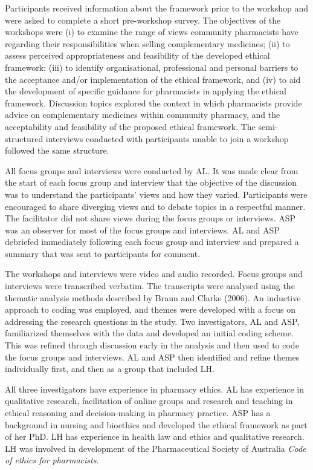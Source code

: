 \documentclass[12pt,]{article}
\begin{document}
Participants received information about the framework prior to the
workshop and were asked to complete a short pre-workshop survey. The
objectives of the workshops were (i) to examine the range of views
community pharmacists have regarding their responsibilities when selling
complementary medicines; (ii) to assess perceived appropriateness and
feasibility of the developed ethical framework; (iii) to identify
organisational, professional and personal barriers to the acceptance
and/or implementation of the ethical framework, and (iv) to aid the
development of specific guidance for pharmacists in applying the ethical
framework. Discussion topics explored the context in which pharmacists
provide advice on complementary medicines within community pharmacy, and
the acceptability and feasibility of the proposed ethical framework. The
semi-structured interviews conducted with participants unable to join a
workshop followed the same structure.

All focus groups and interviews were conducted by AL. It was made clear
from the start of each focus group and interview that the objective of
the discussion was to understand the participants' views and how they
varied. Participants were encouraged to share diverging views and to
debate topics in a respectful manner. The facilitator did not share
views during the focus groups or interviews. ASP was an observer for
most of the focus groups and interviews. AL and ASP debriefed
immediately following each focus group and interview and prepared a
summary that was sent to participants for comment.

The workshops and interviews were video and audio recorded. Focus groups
and interviews were transcribed verbatim. The transcripts were analysed
using the thematic analysis methods described by Braun and Clarke
(2006). An inductive approach to coding was employed, and themes were
developed with a focus on addressing the research questions in the
study. Two investigators, AL and ASP, familiarized themselves with the
data and developed an initial coding scheme. This was refined through
discussion early in the analysis and then used to code the focus groups
and interviews. AL and ASP then identified and refine themes
individually first, and then as a group that included LH.

All three investigators have experience in pharmacy ethics. AL has
experience in qualitative research, facilitation of online groups and
research and teaching in ethical reasoning and decision-making in
pharmacy practice. ASP has a background in nursing and bioethics and
developed the ethical framework as part of her PhD. LH has experience in
health law and ethics and qualitative research. LH was involved in
development of the Pharmaceutical Society of Australia \emph{Code of
ethics for pharmacists}.
\end{document}
